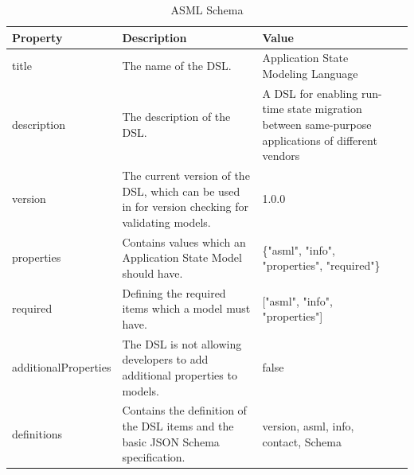 \FloatBarrier
\begin{table}[H]
\begin{tabularx}{\textwidth}{|l|X|X|r|}
\hline
Property             & Description                                                                              & Value                                                                                                                   \\\hline
title                & The name of the DSL.                                                                     & Application State Modeling Language                                                                                     \\\hline
description          & The description of the DSL.                                                              & A DSL for enabling run-time state migration between same-purpose applications of different vendors \\\hline
version              & The current version of the DSL, which can be used in for version checking for validating models. & 1.0.0                                                                                                                   \\\hline
properties           & Contains values which an Application State Model should have.                                       & \{"asml", "info", "properties", "required"\}                                                                            \\\hline
required             & Defining the required items which a model must have.                                     & {[}"asml", "info", "properties"{]}                                                                                      \\\hline
additionalProperties & The DSL is not allowing developers to add additional properties to models.               & false                                                                                                                   \\\hline
definitions          & Contains the definition of the DSL items and the basic JSON Schema specification.        & version, asml, info, contact, Schema

\\\hline
\end{tabularx}
\caption{ASML Schema}
\label{tab:asml-schema}
\end{table}
\FloatBarrier





